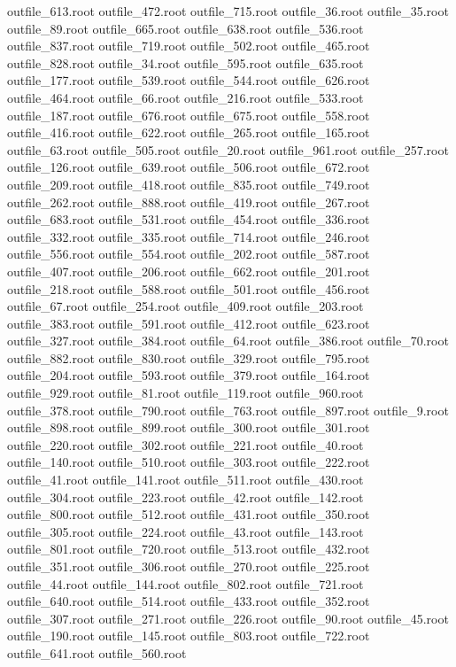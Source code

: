 outfile_613.root
outfile_472.root
outfile_715.root
outfile_36.root
outfile_35.root
outfile_89.root
outfile_665.root
outfile_638.root
outfile_536.root
outfile_837.root
outfile_719.root
outfile_502.root
outfile_465.root
outfile_828.root
outfile_34.root
outfile_595.root
outfile_635.root
outfile_177.root
outfile_539.root
outfile_544.root
outfile_626.root
outfile_464.root
outfile_66.root
outfile_216.root
outfile_533.root
outfile_187.root
outfile_676.root
outfile_675.root
outfile_558.root
outfile_416.root
outfile_622.root
outfile_265.root
outfile_165.root
outfile_63.root
outfile_505.root
outfile_20.root
outfile_961.root
outfile_257.root
outfile_126.root
outfile_639.root
outfile_506.root
outfile_672.root
outfile_209.root
outfile_418.root
outfile_835.root
outfile_749.root
outfile_262.root
outfile_888.root
outfile_419.root
outfile_267.root
outfile_683.root
outfile_531.root
outfile_454.root
outfile_336.root
outfile_332.root
outfile_335.root
outfile_714.root
outfile_246.root
outfile_556.root
outfile_554.root
outfile_202.root
outfile_587.root
outfile_407.root
outfile_206.root
outfile_662.root
outfile_201.root
outfile_218.root
outfile_588.root
outfile_501.root
outfile_456.root
outfile_67.root
outfile_254.root
outfile_409.root
outfile_203.root
outfile_383.root
outfile_591.root
outfile_412.root
outfile_623.root
outfile_327.root
outfile_384.root
outfile_64.root
outfile_386.root
outfile_70.root
outfile_882.root
outfile_830.root
outfile_329.root
outfile_795.root
outfile_204.root
outfile_593.root
outfile_379.root
outfile_164.root
outfile_929.root
outfile_81.root
outfile_119.root
outfile_960.root
outfile_378.root
outfile_790.root
outfile_763.root
outfile_897.root
outfile_9.root
outfile_898.root
outfile_899.root
outfile_300.root
outfile_301.root
outfile_220.root
outfile_302.root
outfile_221.root
outfile_40.root
outfile_140.root
outfile_510.root
outfile_303.root
outfile_222.root
outfile_41.root
outfile_141.root
outfile_511.root
outfile_430.root
outfile_304.root
outfile_223.root
outfile_42.root
outfile_142.root
outfile_800.root
outfile_512.root
outfile_431.root
outfile_350.root
outfile_305.root
outfile_224.root
outfile_43.root
outfile_143.root
outfile_801.root
outfile_720.root
outfile_513.root
outfile_432.root
outfile_351.root
outfile_306.root
outfile_270.root
outfile_225.root
outfile_44.root
outfile_144.root
outfile_802.root
outfile_721.root
outfile_640.root
outfile_514.root
outfile_433.root
outfile_352.root
outfile_307.root
outfile_271.root
outfile_226.root
outfile_90.root
outfile_45.root
outfile_190.root
outfile_145.root
outfile_803.root
outfile_722.root
outfile_641.root
outfile_560.root
